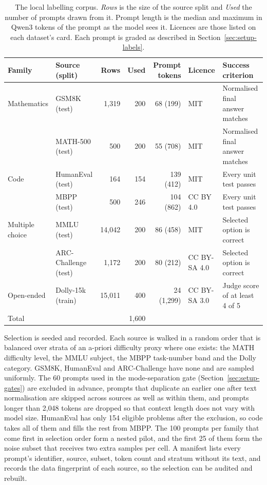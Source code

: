 \begin{table}[ht]
\centering
\small
\caption{The local labelling corpus. \emph{Rows} is the size of the source
split and \emph{Used} the number of prompts drawn from it. Prompt length is
the median and maximum in Qwen3 tokens of the prompt as the model sees it.
Licences are those listed on each dataset's card. Each prompt is graded as
described in Section~\ref{sec:setup-labels}.}
\label{tab:corpus}
\renewcommand{\arraystretch}{1.1}
\begin{tabularx}{\textwidth}{@{}l l r r r l >{\raggedright\arraybackslash}X@{}}
\toprule
Family & Source (split) & Rows & Used & Prompt tokens & Licence & Success criterion \\
\midrule
Mathematics & GSM8K (test)          &  1{,}319 & 200 & 68 (199)   & MIT & Normalised final answer matches \\
            & MATH-500 (test)       &      500 & 200 & 55 (708)   & MIT & Normalised final answer matches \\
Code        & HumanEval (test)      &      164 & 154 & 139 (412)  & MIT & Every unit test passes \\
            & MBPP (test)           &      500 & 246 & 104 (862)  & CC BY 4.0 & Every unit test passes \\
Multiple choice & MMLU (test)       & 14{,}042 & 200 & 86 (458)   & MIT & Selected option is correct \\
            & ARC-Challenge (test)  &  1{,}172 & 200 & 80 (212)   & CC BY-SA 4.0 & Selected option is correct \\
Open-ended  & Dolly-15k (train)     & 15{,}011 & 400 & 24 (1{,}299) & CC BY-SA 3.0 & Judge score of at least 4 of 5 \\
\midrule
Total       &                       &          & 1{,}600 & & & \\
\bottomrule
\end{tabularx}
\end{table}

Selection is seeded and recorded. Each source is walked in a random order
that is balanced over strata of an a-priori difficulty proxy where one
exists: the MATH difficulty level, the MMLU subject, the MBPP task-number
band and the Dolly category. GSM8K, HumanEval and ARC-Challenge have none and
are sampled uniformly. The 60 prompts used in the mode-separation gate
(Section~\ref{sec:setup-gates}) are excluded in advance, prompts that
duplicate an earlier one after text normalisation are skipped across sources
as well as within them, and prompts longer than 2{,}048 tokens are dropped so
that context length does not vary with model size. HumanEval has only 154
eligible problems after the exclusion, so code takes all of them and fills the
rest from MBPP. The 100 prompts per family that come first in selection order
form a nested pilot, and the first 25 of them form the noise subset that
receives two extra samples per cell. A manifest lists every prompt's
identifier, source, subset, token count and stratum without its text, and
records the data fingerprint of each source, so the selection can be audited
and rebuilt.

